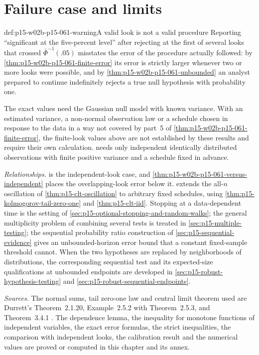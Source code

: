 \section{Failure case and limits}
\label{sec:p15-w02b-p15-061-limits}

\begin{hbwarning}{def:p15-w02b-p15-061-warning}{A valid look is not a valid procedure}
Reporting ``significant at the five-percent level'' after rejecting at the
first of several looks that crossed \(\bar\Phi^{-1}(.05)\) misstates the
error of the procedure actually followed: by
\cref{thm:p15-w02b-p15-061-finite-error} its error is strictly larger
whenever two or more looks were possible, and by
\cref{thm:p15-w02b-p15-061-unbounded} an analyst prepared to continue
indefinitely rejects a true null hypothesis with probability one.

The exact values need the Gaussian null model with known variance. With
an estimated variance, a non-normal observation law or a schedule chosen
in response to the data in a way not covered by part~5 of
\cref{thm:p15-w02b-p15-061-finite-error}, the finite-look values above
are not established by these results and require their own calculation.
 needs only independent identically
distributed observations with finite positive variance and a schedule
fixed in advance.
\end{hbwarning}

\emph{Relationships.}  is the
independent-look case, and \cref{thm:p15-w02b-p15-061-versus-independent}
places the overlapping-look error below it.  extends the
all-\(n\) oscillation of \cref{thm:p15-clt-oscillation} to arbitrary fixed
schedules, using \cref{thm:p15-kolmogorov-tail-zero-one} and
\cref{thm:p15-clt-iid}. Stopping at a data-dependent time is the setting of
\cref{sec:p15-optional-stopping-and-random-walks}; the general
multiplicity problem of combining several tests is treated in
\cref{sec:p15-multiple-testing}; the sequential probability ratio
construction of \cref{sec:p15-sequential-evidence} gives an
unbounded-horizon error bound that a constant fixed-sample threshold
cannot. When the two hypotheses are replaced by neighborhoods of
distributions, the corresponding sequential test and its expected-size
qualifications at unbounded endpoints are developed in
\cref{sec:p15-robust-hypothesis-testing} and
\cref{sec:p15-robust-sequential-endpoints}.

\emph{Sources.} The normal sums, tail zero-one law and central limit
theorem used are Durrett's Theorem~2.1.20, Example~2.5.2 with
Theorem~2.5.3, and Theorem~3.4.1
\cite[p.~52; p.~81; p.~144]{DurrettPTEAuthor2019}. The dependence
lemma, the inequality for monotone functions of independent variables,
the exact error formulas, the strict inequalities, the comparison with
independent looks, the calibration result and the numerical values are proved or computed in this chapter
and its annex.
